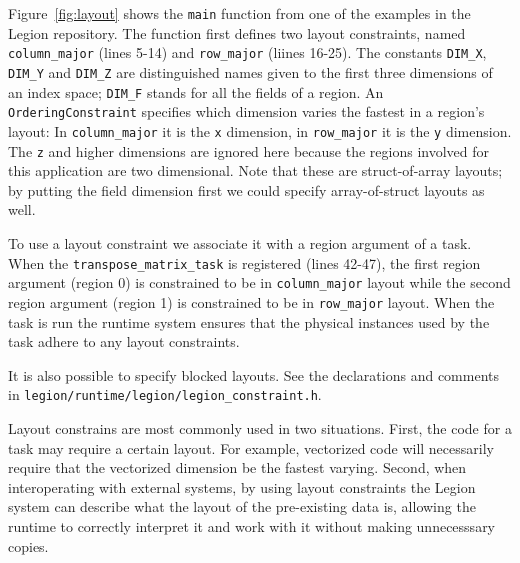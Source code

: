 Figure~\ref{fig:layout} shows the {\tt main} function from one of the examples in the Legion repository.  The function first defines two layout constraints, named {\tt column\_major} (lines 5-14) and {\tt row\_major} (liines 16-25).
The constants {\tt DIM\_X}, {\tt DIM\_Y} and {\tt DIM\_Z} are distinguished names given to the first three dimensions of an index space; {\tt DIM\_F} stands for all the fields of a region. An {\tt OrderingConstraint}
specifies which dimension varies the fastest in a region's layout: In {\tt column\_major} it is the {\tt x} dimension, in {\tt row\_major} it is the {\tt y} dimension.  The {\tt z} and higher dimensions are ignored here
because the regions involved for this application are two dimensional.   Note that these are struct-of-array layouts; by putting the field dimension first we could specify array-of-struct layouts as well.

To use a layout constraint we associate it with a region argument of a task.  When the {\tt transpose\_matrix\_task} is registered (lines 42-47), the first region argument (region 0) is constrained to be in {\tt column\_major} layout while the
second region argument (region 1) is constrained to be in {\tt row\_major} layout.  When the task is run the runtime system ensures that the physical instances used by the task adhere to any layout constraints.

It is also possible to specify blocked layouts. See the declarations and comments in {\tt legion/runtime/legion/legion\_constraint.h}.

Layout constrains are most commonly used in two situations. First, the code for a task may require a certain layout.  For example, vectorized code will necessarily require that the vectorized dimension be the fastest varying.  Second, when interoperating with
external systems, by using layout constraints the Legion system can describe what the layout of the pre-existing data is, allowing the runtime to correctly interpret it and work with it without making unnecesssary copies.

